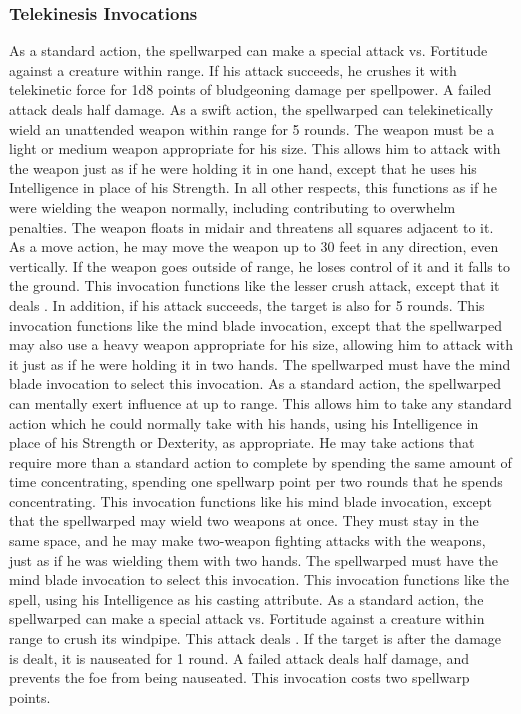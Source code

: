 \subsubsection{Telekinesis Invocations}
As a standard action, the spellwarped can make a special attack vs. Fortitude against a creature within \rngclose range.
If his attack succeeds, he crushes it with telekinetic force for 1d8 points of bludgeoning damage  per spellpower.
A failed attack deals half damage.
As a swift action, the spellwarped can telekinetically wield an unattended weapon within \rngclose range for 5 rounds.
The weapon must be a light or medium weapon appropriate for his size.
This allows him to attack with the weapon just as if he were holding it in one hand, except that he uses his Intelligence in place of his Strength.
In all other respects, this functions as if he were wielding the weapon normally, including contributing to overwhelm penalties.
The weapon floats in midair and threatens all squares adjacent to it.
As a move action, he may move the weapon up to 30 feet in any direction, even vertically.
If the weapon goes outside of \rngclose range, he loses control of it and it falls to the ground.
This invocation functions like the lesser crush attack, except that it deals .
In addition, if his attack succeeds, the target is also \sickened for 5 rounds.
This invocation functions like the mind blade invocation, except that the spellwarped may also use a heavy weapon appropriate for his size, allowing him to attack with it just as if he were holding it in two hands.
The spellwarped must have the mind blade invocation to select this invocation.
As a standard action, the spellwarped can mentally exert influence at up to \rngclose range.
This allows him to take any standard action which he could normally take with his hands, using his Intelligence in place of his Strength or Dexterity, as appropriate.
He may take actions that require more than a standard action to complete by spending the same amount of time concentrating, spending one spellwarp point per two rounds that he spends concentrating.
This invocation functions like his mind blade invocation, except that the spellwarped may wield two weapons at once.
They must stay in the same space, and he may make two-weapon fighting attacks with the weapons, just as if he was wielding them with two hands.
The spellwarped must have the mind blade invocation to select this invocation.
 This invocation functions like the 
spell, using his Intelligence as his casting attribute.
As a standard action, the spellwarped can make a special attack vs. Fortitude against a creature within \rngclose range to crush its windpipe.
This attack deals .
If the target is \bloodied after the damage is dealt, it is nauseated for 1 round.
A failed attack deals half damage, and prevents the foe from being nauseated.
This invocation costs two spellwarp points.


